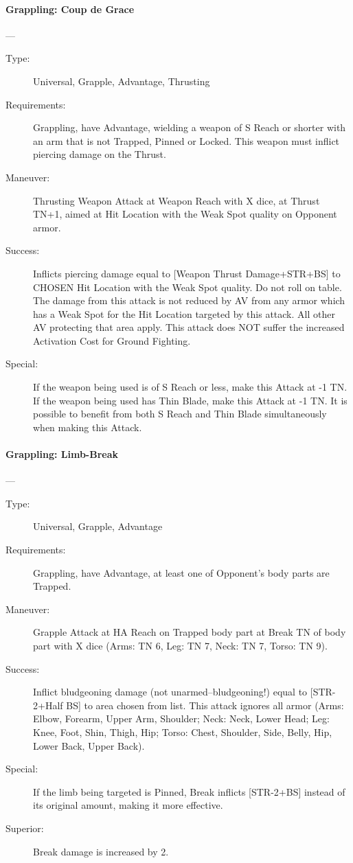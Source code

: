 \documentclass[oneside,11pt,english]{book}
\begin{document}
\paragraph{\large\label{man:Grappling: Coup de Grace}Grappling: Coup de Grace}---\quad{\large[X+2]}
\vspace{-10pt}\begin{description} 
\item [Type:] Universal, Grapple, Advantage, Thrusting 
\item [Requirements:] Grappling, have Advantage, wielding a weapon of S Reach or shorter with an arm that is 
not Trapped, Pinned or Locked. This weapon must inflict piercing damage on the Thrust. 
\item [Maneuver:] Thrusting Weapon Attack at Weapon Reach with X dice, at Thrust TN+1, aimed at Hit 
Location with the Weak Spot quality on Opponent armor. 
\item [Success:] Inflicts piercing damage equal to [Weapon Thrust Damage+STR+BS] to CHOSEN Hit Location 
with the Weak Spot quality. Do not roll on table. The damage from this attack is not reduced by AV from 
any armor which has a Weak Spot for the Hit Location targeted by this attack. All other AV protecting 
that area apply. 
This attack does NOT suffer the increased Activation Cost for Ground Fighting. 
\item [Special:] If the weapon being used is of S Reach or less, make this Attack at -1 TN. If the weapon being 
used has Thin Blade, make this Attack at -1 TN. It is possible to benefit from both S Reach and Thin 
Blade simultaneously when making this Attack. 
\end{description}
\paragraph{\large\label{man:Grappling: Limb-Break}Grappling: Limb-Break}---\quad{\large[X]}
\vspace{-10pt}\begin{description} 
\item [Type:] Universal, Grapple, Advantage 
\item [Requirements:] Grappling, have Advantage, at least one of Opponent's body parts are Trapped. 
\item [Maneuver:] Grapple Attack at HA Reach on Trapped body part at Break TN of body part with X dice 
(Arms: TN 6, Leg: TN 7, Neck: TN 7, Torso: TN 9). 
\item [Success:] Inflict bludgeoning damage (not unarmed--bludgeoning!) equal to [STR-2+Half BS] to area 
chosen from list. This attack ignores all armor (Arms: Elbow, Forearm, Upper Arm, Shoulder; Neck: 
Neck, Lower Head; Leg: Knee, Foot, Shin, Thigh, Hip; Torso: Chest, Shoulder, Side, Belly, Hip, Lower 
Back, Upper Back). 
\item [Special:] If the limb being targeted is Pinned, Break inflicts [STR-2+BS] instead of its original amount, 
making it more effective. 
\item [Superior:] Break damage is increased by 2. 
\end{description}
\end{document}
